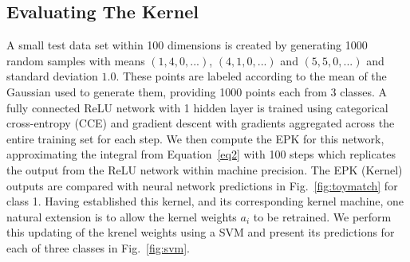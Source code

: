 \subsection{Evaluating The Kernel} \label{subsec:evaluate}
A small test data set within 100 dimensions is created by generating 1000 random samples with means $(1,4,0,...)$, $(4,1,0,...)$ and $(5,5,0,...)$ and standard deviation $1.0$. These points are labeled according to the mean of the Gaussian used to generate them, providing 1000 points each from 3 classes. A fully connected ReLU network with 1 hidden layer is trained using categorical cross-entropy (CCE) and gradient descent with gradients aggregated across the entire training set for each step. We then compute the EPK for this network, approximating the integral from Equation~\ref{eq2} with 100 steps which replicates the output from the ReLU network within machine precision. The EPK (Kernel) outputs are compared with neural network predictions in Fig.~\ref{fig:toymatch} for class 1. Having established this kernel, and its corresponding kernel machine, one natural extension is to allow the kernel weights $a_i$ to be retrained. We perform this updating of the krenel weights using a SVM and present its predictions for each of three classes in Fig.~\ref{fig:svm}.
    



